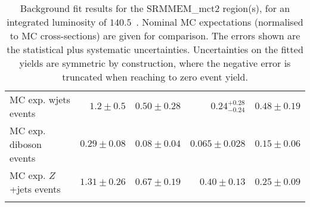 \begin{table}
\begin{center}
{\begin{tabular*}{\textwidth}{@{\extracolsep{\fill}}lrrrr}
        MC exp. wjets events         & $1.2 \pm 0.5$          & $0.50 \pm 0.28$          & $0.24_{-0.24}^{+0.28}$          & $0.48 \pm 0.19$              \\
        MC exp. diboson events         & $0.29 \pm 0.08$          & $0.08 \pm 0.04$          & $0.065 \pm 0.028$          & $0.15 \pm 0.06$              \\
        MC exp. $Z$+jets events         & $1.31 \pm 0.26$          & $0.67 \pm 0.19$          & $0.40 \pm 0.13$          & $0.25 \pm 0.09$              \\
\noalign{\smallskip}\hline\noalign{\smallskip}
\end{tabular*}
}
\end{center}
\caption{ Background fit results for the SRMMEM\_mct2 region(s),  for an integrated luminosity of $140.5$~\ifb.
Nominal MC expectations (normalised to MC cross-sections) are given for comparison. 
The errors shown are the statistical plus systematic uncertainties.
Uncertainties on the fitted yields are symmetric by construction, 
where the negative error is truncated when reaching to zero event yield.
}
\label{table.results.yields.fit.SRMMEM}
\end{table}
%